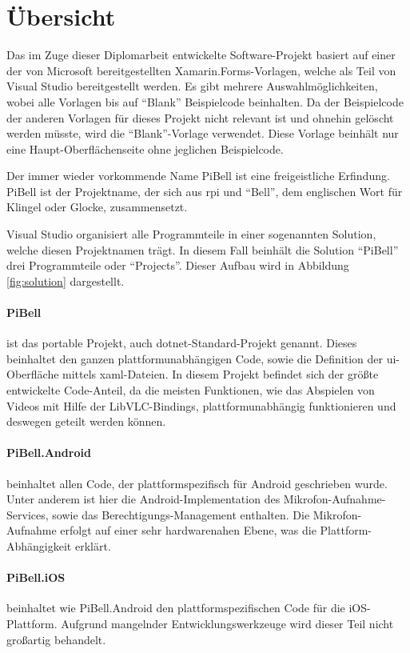 \label{ch:prog-doc}
\section{Übersicht}
Das im Zuge dieser Diplomarbeit entwickelte Software-Projekt basiert auf einer der von Microsoft bereitgestellten Xamarin.Forms-Vorlagen, welche als Teil von Visual Studio bereitgestellt werden.
Es gibt mehrere Auswahlmöglichkeiten, wobei alle Vorlagen bis auf \enquote{Blank} Beispielcode beinhalten.
Da der Beispielcode der anderen Vorlagen für dieses Projekt nicht relevant ist und ohnehin gelöscht werden müsste, wird die \enquote{Blank}-Vorlage verwendet.
Diese Vorlage beinhält nur eine Haupt-Oberflächenseite ohne jeglichen Beispielcode.

Der immer wieder vorkommende Name PiBell ist eine freigeistliche Erfindung. PiBell ist der Projektname, der sich aus \acl{rpi} und \enquote{Bell}, dem englischen Wort für Klingel oder Glocke, zusammensetzt.

Visual Studio organisiert alle Programmteile in einer sogenannten Solution, welche diesen Projektnamen trägt. In diesem Fall beinhält die Solution \enquote{PiBell} drei Programmteile oder \enquote{Projects}.
Dieser Aufbau wird in Abbildung \ref{fig:solution} dargestellt.

\paragraph{PiBell} ist das portable Projekt, auch \ac{dotnet}-Standard-Projekt genannt.
Dieses beinhaltet den ganzen plattformunabhängigen Code, sowie die Definition der \ac{ui}-Oberfläche mittels \ac{xaml}-Dateien.
In diesem Projekt befindet sich der größte entwickelte Code-Anteil, da die meisten Funktionen, wie das Abspielen von Videos mit Hilfe der LibVLC-Bindings, plattformunabhängig funktionieren und deswegen geteilt werden können.

\paragraph{PiBell.Android} beinhaltet allen Code, der plattformspezifisch für Android geschrieben wurde.
Unter anderem ist hier die Android-Implementation des Mikrofon-Auf\-nahme-Services, sowie das Berechtigungs-Management enthalten.
Die Mikrofon-Aufnahme erfolgt auf einer sehr hardwarenahen Ebene, was die Plattform-Abhängigkeit erklärt.

\paragraph{PiBell.iOS} beinhaltet wie PiBell.Android den plattformspezifischen Code für die iOS-Platt\-form. Aufgrund mangelnder Entwicklungswerkzeuge wird dieser Teil nicht großartig behandelt.\par

